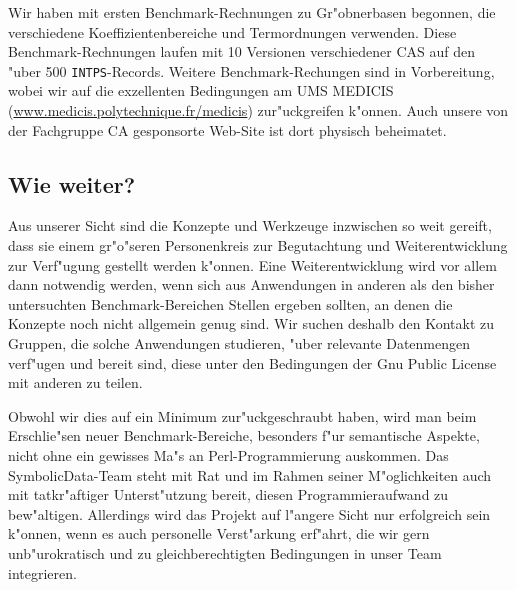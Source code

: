 \documentclass{article}
\newcommand{\SD}{{\sc Symbolic\-Data}}
\begin{document}
Wir haben mit ersten Benchmark-Rechnungen zu Gr"obnerbasen begonnen,
die verschiedene Koeffizientenbereiche und Termordnungen verwenden.
Diese Benchmark-Rechnungen laufen mit 10 Versionen verschiedener CAS
auf den "uber 500 {\tt INTPS}-Records. Weitere Benchmark-Rechungen
sind in Vorbereitung, wobei wir auf die exzellenten Bedingungen am UMS
MEDICIS (\url{www.medicis.polytechnique.fr/medicis}) zur"uckgreifen
k"onnen.  Auch unsere von der Fachgruppe CA gesponsorte Web-Site ist
dort physisch beheimatet.

\subsection*{Wie weiter?}

Aus unserer Sicht sind die Konzepte und Werkzeuge inzwischen so weit
gereift, dass sie einem gr"o"seren Personenkreis zur Begutachtung und
Weiterentwicklung zur Verf"ugung gestellt werden k"onnen. Eine
Weiterentwicklung wird vor allem dann notwendig werden, wenn sich aus
Anwendungen in anderen als den bisher untersuchten Benchmark-Bereichen
Stellen ergeben sollten, an denen die Konzepte noch nicht allgemein
genug sind.  Wir suchen deshalb den Kontakt zu Gruppen, die solche
Anwendungen studieren, "uber relevante Datenmengen verf"ugen und
bereit sind, diese unter den Bedingungen der Gnu Public License mit
anderen zu teilen.

Obwohl wir dies auf ein Minimum zur"uckgeschraubt haben, wird man beim
Erschlie"sen neuer Benchmark-Bereiche, besonders f"ur semantische
Aspekte, nicht ohne ein gewisses Ma"s an Perl-Programmierung
auskommen.  Das \SD-Team steht mit Rat und im Rahmen seiner
M"oglichkeiten auch mit tatkr"aftiger Unterst"utzung bereit, diesen
Programmieraufwand zu bew"altigen.  Allerdings wird das Projekt auf
l"angere Sicht nur erfolgreich sein k"onnen, wenn es auch personelle
Verst"arkung erf"ahrt, die wir gern unb"urokratisch und zu
gleichberechtigten Bedingungen in unser Team integrieren.
\end{document}
